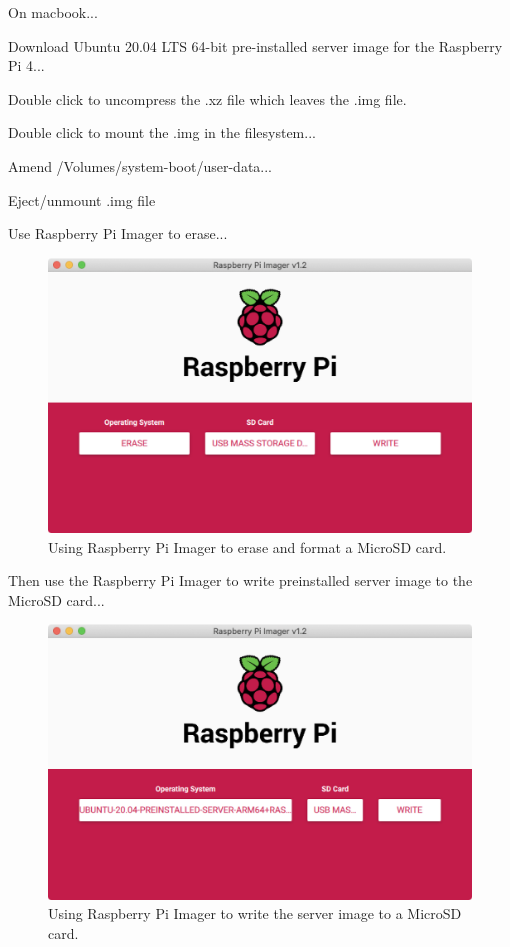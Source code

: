 \documentclass{article}
\begin{document}
On macbook...

Download Ubuntu 20.04 LTS 64-bit pre-installed server image for the Raspberry Pi 4...

Double click to uncompress the .xz file which leaves the .img file. 

Double click to mount the .img in the filesystem...

Amend /Volumes/system-boot/user-data...



Eject/unmount .img file

Use Raspberry Pi Imager to erase...

\begin{figure}
	\centering	
	\includegraphics[width=1.0\textwidth]{screenshots/imager-erase.png}
	\caption{Using Raspberry Pi Imager to erase and format a MicroSD card.}
\end{figure}

Then use the Raspberry Pi Imager to write preinstalled server image to the MicroSD card...

\begin{figure}
	\centering	
	\includegraphics[width=1.0\textwidth]{screenshots/imager-write.png}
	\caption{Using Raspberry Pi Imager to write the server image to a MicroSD card.}
\end{figure}
\end{document}

